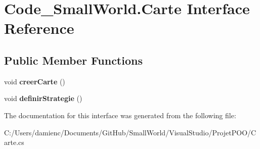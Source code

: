 \hypertarget{interface_code___small_world_1_1_carte}{\section{Code\-\_\-\-Small\-World.\-Carte Interface Reference}
\label{interface_code___small_world_1_1_carte}
}
\subsection*{Public Member Functions}
\begin{DoxyCompactItemize}
\item 
\hypertarget{interface_code___small_world_1_1_carte_a2cdee02a72a1d56f9d115c61dd410f56}{void {\bfseries creer\-Carte} ()}\label{interface_code___small_world_1_1_carte_a2cdee02a72a1d56f9d115c61dd410f56}

\item 
\hypertarget{interface_code___small_world_1_1_carte_af92fd1c52fecdc2f90ec17002c4038cd}{void {\bfseries definir\-Strategie} ()}\label{interface_code___small_world_1_1_carte_af92fd1c52fecdc2f90ec17002c4038cd}

\end{DoxyCompactItemize}


The documentation for this interface was generated from the following file\-:\begin{DoxyCompactItemize}
\item 
C\-:/\-Users/damienc/\-Documents/\-Git\-Hub/\-Small\-World/\-Visual\-Studio/\-Projet\-P\-O\-O/Carte.\-cs\end{DoxyCompactItemize}
